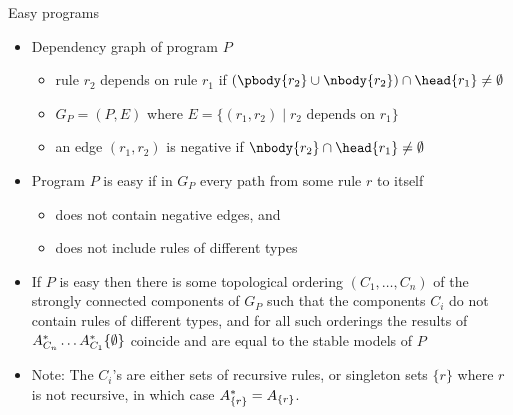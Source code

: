
\begin{frame}{Easy programs}
  \begin{itemize}
    \item Dependency graph of program $P$
      \begin{itemize}
        \item rule $r_2$ depends on rule $r_1$
              if $(\pbody{r_2}\cup\nbody{r_2})\cap\head{r_1}\neq\emptyset$
        \item $G_P=(P,E)$ where $E=\{ (r_1,r_2) \mid r_2 \mbox{ depends on } r_1 \}$
        \item an edge $(r_1,r_2)$ is negative if $\nbody{r_2}\cap\head{r_1}\neq\emptyset$
      \end{itemize}
    \item Program $P$ is easy if in $G_P$ every path from some rule $r$ to itself
     \begin{itemize}
       \item does not contain negative edges, and 
       \item does not include rules of different types
     \end{itemize} 
    \item If $P$ is easy then there is some topological ordering
          $(C_1, \ldots, C_n)$ of the strongly connected components
          of $G_P$ such that the components $C_i$ do not contain rules of different types, and
          for all such orderings the results of
          $A_{C_n}^{*}\ldots A_{C_1}^{*}\{\emptyset\}$
          coincide and are equal to the stable models of $P$
    \item Note: 
          The $C_i$'s are either sets of recursive rules, or
          singleton sets $\{r\}$ where $r$ is not recursive,
          in which case $A_{{\{r\}}}^{*}=A_{\{r\}}$.
  \end{itemize}
\end{frame}

